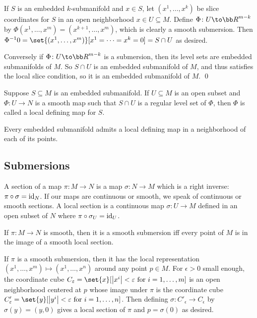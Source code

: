 \eprop

\bproof

    If $S$ is an embedded $k$-submanifold and $x\in S$, let $(x^1,\dots,x^k)$ be slice coordinates for $S$ in an
    open neighborhood $x\in U\subseteq M$.
    Define $\Phi\colon U\to\bR^{m-k}$ by $\Phi(x^1,\dots,x^m)=(x^{k+1},\dots,x^m)$, which is clearly a smooth submersion.
    Then $\Phi^{-1}0=\set{(x^1,\dots,x^m)}[x^1=\cdots=x^k=0]=S\cap U$ as desired.

    Conversely if $\Phi\colon U\to\bR^{m-k}$ is a submersion, then its level sets are embedded submanifolds of $M$.
    So $S\cap U$ is an embedded submanifold of $M$, and thus satisfies the local slice condition, so it is an
    embedded submanifold of $M$.
    \qed

\eproof

\bdefn

    Suppose $S\subseteq M$ is an embedded submanifold.
    If $U\subseteq M$ is an open subset and $\Phi\colon U\to N$ is a smooth map such that $S\cap U$ is a regular level set of
    $\Phi$, then $\Phi$ is called a {\emphcolor local defining map for $S$}.

\edefn

\bcoro

    Every embedded submanifold admits a local defining map in a neighborhood of each of its points.

\ecoro

\subsection{Submersions}

A {\emphcolor section} of a map $\pi\colon M\to N$ is a map $\sigma\colon N\to M$ which is a right inverse: $\pi\circ\sigma={\rm id}_N$.
If our maps are continuous or smooth, we speak of continuous or smooth sections.
A {\emphcolor local section} is a continuous map $\sigma\colon U\to M$ defined in an open subset of $N$ where $\pi\circ\sigma_U={\rm id}_U$.

\bthrm

    If $\pi\colon M\to N$ is smooth, then it is a smooth submersion iff every point of $M$ is in the image of a smooth local section.

\ethrm

\bproof

    If $\pi$ is a smooth submersion, then it has the local representation $(x^1,\dots,x^m)\mapsto(x^1,\dots,x^n)$ around any point $p\in M$.
    For $\epsilon>0$ small enough, the coordinate cube $C_\epsilon=\set{x}[\abs{x^i}<\epsilon\hbox{ for $i=1,\dots,m$}]$ is an open neighborhood
    centered at $p$ whose image under $\pi$ is the coordinate cube $C'_\epsilon=\set{y}[\abs{y^i}<\epsilon\hbox{ for $i=1,\dots,n$}]$.
    Then defining $\sigma\colon C'_\epsilon\to C_\epsilon$ by $\sigma(y)=(y,0)$ gives a local section of $\pi$ and $p=\sigma(0)$ as desired.

